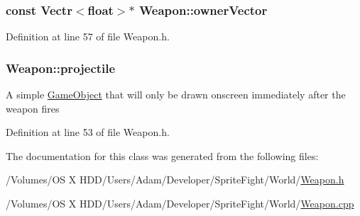 \hypertarget{class_weapon_a5aad357adfe3e9bdcebc95ee99202ab4}{
\subsubsection[{owner\-Vector}]{\setlength{\rightskip}{0pt plus 5cm}const {\bf Vectr}$<$float$>$$\ast$ Weapon\-::owner\-Vector\hspace{0.3cm}{\ttfamily [protected]}}}\label{class_weapon_a5aad357adfe3e9bdcebc95ee99202ab4}


Definition at line 57 of file Weapon.\-h.

\hypertarget{class_weapon_ab4dcfce3b3a14222f847e50e95451164}{
\subsubsection[{projectile}]{ Weapon\-::projectile\hspace{0.3cm}{\ttfamily [protected]}}}\label{class_weapon_ab4dcfce3b3a14222f847e50e95451164}
A simple \hyperlink{class_game_object}{Game\-Object} that will only be drawn onscreen immediately after the weapon fires 

Definition at line 53 of file Weapon.\-h.



The documentation for this class was generated from the following files\-:\begin{DoxyCompactItemize}
\item 
/\-Volumes/\-O\-S X H\-D\-D/\-Users/\-Adam/\-Developer/\-Sprite\-Fight/\-World/\hyperlink{_weapon_8h}{Weapon.\-h}\item 
/\-Volumes/\-O\-S X H\-D\-D/\-Users/\-Adam/\-Developer/\-Sprite\-Fight/\-World/\hyperlink{_weapon_8cpp}{Weapon.\-cpp}\end{DoxyCompactItemize}
